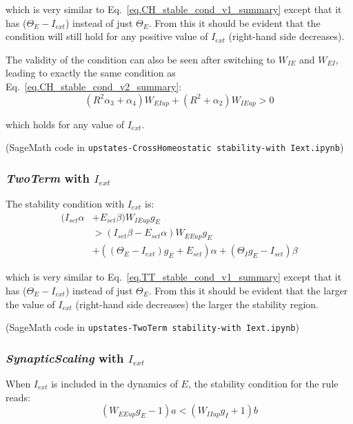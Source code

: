 \documentclass[twocolumn]{article}
\newcommand{\EE}{\mathit{EE}}
\newcommand{\EI}{\mathit{EI}}
\newcommand{\IE}{\mathit{IE}}
\newcommand{\II}{\mathit{II}}
\newcommand{\set}{\mathit{set}}
\newcommand{\ext}{\mathit{ext}}
\newcommand{\up}{\mathit{up}}
\begin{document}
\noindent which is very similar to Eq.\ \ref{eq.CH_stable_cond_v1_summary} except that it has ($\Theta_E - I_{\ext}$) instead of just $\Theta_E$. From this it should be evident that the condition will still hold for any positive value of $I_{\ext}$ (right-hand side decreases).

The validity of the condition can also be seen after switching to $W_{IE}$ and $W_{EI}$, leading to exactly the same condition as Eq.\ \ref{eq.CH_stable_cond_v2_summary}:
\begin{equation}
(R^2 \alpha_3 + \alpha_4) W_{\EI\up} + (R^2 + \alpha_2) W_{\IE\up} > 0
\label{eq.CH_stable_cond_v2_nonparadox}
\end{equation}

\noindent which holds for any value of $I_{\ext}$.

(SageMath code in {\tt upstates-CrossHomeostatic stability-with Iext.ipynb})



\subsubsection{{\em TwoTerm} with $I_{\ext}$}

The stability condition with $I_{\ext}$ is:
\begin{equation}
\begin{aligned}
(I_{\set} \alpha & + E_{\set} \beta) W_{\IE\up} g_E \\
& > (I_{\set} \beta - E_{\set} \alpha) W_{\EE\up} g_E \\
& + ((\Theta_E - I_{\ext}) g_E + E_{\set}) \alpha + (\Theta_I g_E - I_{\set}) \beta
\end{aligned}
\label{eq.TT_stable_cond_v1_nonparadox}
\end{equation}

\noindent which is very similar to Eq.\ \ref{eq.TT_stable_cond_v1_summary} except that it has ($\Theta_E - I_{\ext}$) instead of just $\Theta_E$. From this it should be evident that the larger the value of $I_{\ext}$ (right-hand side decreases) the larger the stability region.

(SageMath code in {\tt upstates-TwoTerm stability-with Iext.ipynb})


\subsubsection{{\em SynapticScaling} with $I_{\ext}$}

When $I_{\ext}$ is included in the dynamics of $E$, the stability condition for the rule reads:
\begin{equation}
(W_{\EE\up}g_E - 1)a < (W_{\II\up}g_I + 1)b
\label{eq.SS_stable_cond_v1_nonparadox}
\end{equation}
\end{document}
